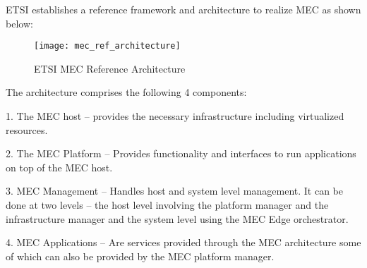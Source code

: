 \documentclass[../seminar.tex]{subfiles}
\begin{document}
ETSI establishes a reference framework and architecture to realize MEC as shown below:

\begin{figure}
	\centering
    \texttt{[image: mec\_ref\_architecture]}
    \label{fig:Figure 2}
    \caption{ETSI MEC Reference Architecture}
\end{figure}

The architecture comprises the following 4 components:

1. The MEC host – provides the necessary infrastructure including virtualized resources.

2. The MEC Platform – Provides functionality and interfaces to run applications on top of the MEC host.

3. MEC Management – Handles host and system level management. It can be done at two levels – the host level involving the platform manager and the infrastructure manager and the system level using the MEC Edge orchestrator. 

4. MEC Applications – Are services provided through the MEC architecture some of which can also be provided by the MEC platform manager.
\end{document}
